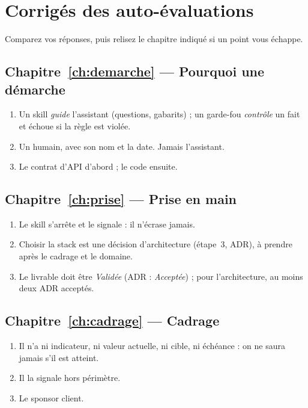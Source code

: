 \chapter{Corrigés des auto-évaluations}\label{app:corriges}
Comparez vos réponses, puis relisez le chapitre indiqué si un point vous échappe.

\section*{Chapitre~\ref{ch:demarche} --- Pourquoi une démarche}
\begin{enumerate}[label=\sffamily\bfseries\color{leaf}Q\arabic*.,leftmargin=2.2em]
  \item Un skill \emph{guide} l'assistant (questions, gabarits) ; un garde-fou \emph{contrôle} un fait et échoue si la règle est violée.
  \item Un humain, avec son nom et la date. Jamais l'assistant.
  \item Le contrat d'API d'abord ; le code ensuite.
\end{enumerate}
\section*{Chapitre~\ref{ch:prise} --- Prise en main}
\begin{enumerate}[label=\sffamily\bfseries\color{leaf}Q\arabic*.,leftmargin=2.2em]
  \item Le skill s'arrête et le signale : il n'écrase jamais.
  \item Choisir la stack est une décision d'architecture (étape~3, ADR), à prendre après le cadrage et le domaine.
  \item Le livrable doit être \emph{Validée} (ADR : \emph{Acceptée}) ; pour l'architecture, au moins deux ADR acceptés.
\end{enumerate}
\section*{Chapitre~\ref{ch:cadrage} --- Cadrage}
\begin{enumerate}[label=\sffamily\bfseries\color{leaf}Q\arabic*.,leftmargin=2.2em]
  \item Il n'a ni indicateur, ni valeur actuelle, ni cible, ni échéance : on ne saura jamais s'il est atteint.
  \item Il la signale hors périmètre.
  \item Le sponsor client.
\end{enumerate}
